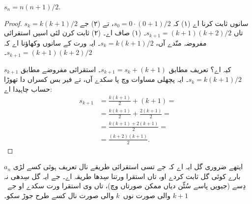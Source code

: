 \documentclass[../../../include/open-logic-section]{subfiles}
\begin{document}
\begin{prop}
  $s_n = n(n+1)/2$.
\end{prop}

\begin{proof}
  سانوں ثابت کرنا اے (۱) کہ $s_0 = 0\cdot(0 + 1)/2$، تے (۲) جے $s_k =
  k(k+1)/2$ تاں $s_{k+1} = (k+1)(k+2)/2$۔ (۱) صاف اے۔ (۲) ثابت کرن لئی اسیں استقرائی مفروضہ منّدے آں، $s_k = k(k+1)/2$۔ ایہ ورت کے سانوں وکھاؤنا اے کہ $s_{k+1} = (k+1)(k+2)/2$۔

  $s_{k+1}$ کیہ اے؟ تعریف مطابق $s_{k+1} = s_k + (k+1)$۔ استقرائی مفروضے مطابق $s_k = k(k+1)/2$۔ ایہ پچھلی مساوات وچ پا سکدے آں، تے فیر بس کسراں دا تھوڑا حساب چاہیدا اے:
  \begin{align*}
    s_{k+1} & = \frac{k(k+1)}{2} + (k+1) = {}\\
    & = \frac{k(k+1)}{2} + \frac{2(k+1)}{2} = {}\\
    & = \frac{k(k+1) + 2(k+1)}{2} = {}\\
    & = \frac{(k+2)(k+1)}{2}.
  \end{align*}
\end{proof}

ایتھے ضروری گل ایہ اے کہ جے تسی استقرائی طریقے نال تعریف ہوئی کسے لڑی $a_n$ بارے کوئی گل ثابت کردے او، تاں استقرا ورتنا سِدھا طریقہ اے۔ جے ایہ گل سِدھی نہ دِسے (جیویں پاسے سُٹّن دیاں ممکن صورتاں وچ)، تاں وی استقرا ورت سکدے او جے~$k+1$ والی صورت نوں~$k$ والی صورت نال کسے طرح جوڑ سکو۔
\end{document}
